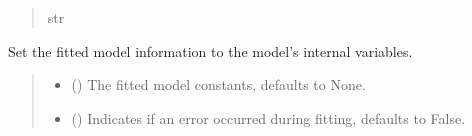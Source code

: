 \documentclass[letterpaper,10pt,english]{sphinxmanual}
\begin{document}
\begin{fulllineitems}
\begin{fulllineitems}
\begin{quote}
\begin{description}
\sphinxAtStartPar
str

\end{description}\end{quote}

\end{fulllineitems}


\begin{fulllineitems}
\label{\detokenize{VPCModel:src.VPCModel.VPCModel.set_fit_information}}
\pysigstartsignatures
{}
\pysigstopsignatures
\sphinxAtStartPar
Set the fitted model information to the model’s internal variables.
\begin{quote}\begin{description}
\begin{itemize}
\item {} 
\sphinxAtStartPar
{} (\sphinxstyleliteralemphasis{\sphinxupquote{{[}}}\sphinxstyleliteralemphasis{\sphinxupquote{, }}\sphinxstyleliteralemphasis{\sphinxupquote{{]}}}) \textendash{} The fitted model constants, defaults to None.

\item {} 
\sphinxAtStartPar
{} () \textendash{} Indicates if an error occurred during fitting, defaults to False.

\end{itemize}

\end{description}\end{quote}

\end{fulllineitems}


\end{fulllineitems}
\end{document}
